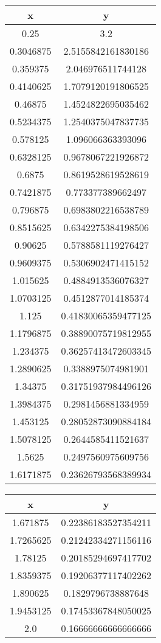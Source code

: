 \documentclass [12pt]{article}
\begin{document}
\begin{center}
 \begin{tabular}{|c|c|}
\hline
x & y\\
\hline
0.25 & 3.2\\
\hline
0.3046875 & 2.5155842161830186\\
\hline
0.359375 & 2.046976511744128\\
\hline
0.4140625 & 1.7079120191806525\\
\hline
0.46875 & 1.4524822695035462\\
\hline
0.5234375 & 1.2540375047837735\\
\hline
0.578125 & 1.096066363393096\\
\hline
0.6328125 & 0.9678067221926872\\
\hline
0.6875 & 0.8619528619528619\\
\hline
0.7421875 & 0.773377389662497\\
\hline
0.796875 & 0.6983802216538789\\
\hline
0.8515625 & 0.6342275384198506\\
\hline
0.90625 & 0.5788581119276427\\
\hline
0.9609375 & 0.5306902471415152\\
\hline
1.015625 & 0.4884913536076327\\
\hline
1.0703125 & 0.4512877014185374\\
\hline
1.125 & 0.41830065359477125\\
\hline
1.1796875 & 0.38890075719812955\\
\hline
1.234375 & 0.36257413472603345\\
\hline
1.2890625 & 0.3388975074981901\\
\hline
1.34375 & 0.31751937984496126\\
\hline
1.3984375 & 0.2981456881334959\\
\hline
1.453125 & 0.28052873090884184\\
\hline
1.5078125 & 0.2644585411521637\\
\hline
1.5625 & 0.2497560975609756\\
\hline
1.6171875 & 0.23626793568389934\\
\hline
\end{tabular}
\end{center}

\begin{center}
 \begin{tabular}{|c|c|}
\hline
x & y\\
\hline
1.671875 & 0.22386183527354211\\
\hline
1.7265625 & 0.21242334271156116\\
\hline
1.78125 & 0.20185294697417702\\
\hline
1.8359375 & 0.19206377117402262\\
\hline
1.890625 & 0.1829796738887648\\
\hline
1.9453125 & 0.17453367848050025\\
\hline
2.0 & 0.16666666666666666\\
\hline
\end{tabular}
\end{center}
\end{document}
